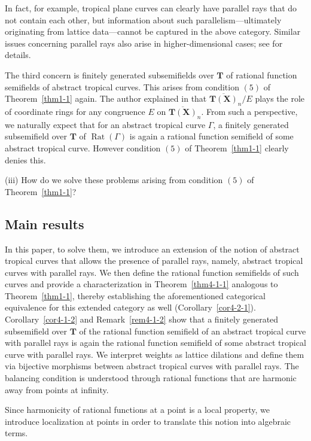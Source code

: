 \documentclass[a4paper,12pt]{amsart}
\def\Gamma{\varGamma}
\begin{document}
In fact, for example, tropical plane curves can clearly have parallel rays that do not contain each other, but information about such parallelism—ultimately originating from lattice data—cannot be captured in the above category.
Similar issues concerning parallel rays also arise in higher-dimensional cases; see \cite{Amini=Kawaguchi=Song} for details.

The third concern is finitely generated subsemifields over $\boldsymbol{T}$ of rational function semifields of abstract tropical curves.
This arises from condition $(5)$ of Theorem~\ref{thm1-1} again.
The author explained in \cite[Section~$1$]{JuAe4} that $\overline{\boldsymbol{T}(\boldsymbol{X})}_n / E$ plays the role of coordinate rings for any congruence $E$ on $\overline{\boldsymbol{T}(\boldsymbol{X})}_n$.
From such a perspective, we naturally expect that for an abstract tropical curve $\Gamma$, a finitely generated subsemifield over $\boldsymbol{T}$ of $\operatorname{Rat}(\Gamma)$ is again a rational function semifield of some abstract tropical curve.
However condition $(5)$ of Theorem~\ref{thm1-1} clearly denies this.

(iii) How do we solve these problems arising from condition $(5)$ of Theorem~\ref{thm1-1}?

\subsection*{Main results}

In this paper, to solve them, we introduce an extension of the notion of abstract tropical curves that allows the presence of parallel rays, namely, abstract tropical curves with parallel rays.
We then define the rational function semifields of such curves and provide a characterization in Theorem~\ref{thm4-1-1} analogous to Theorem~\ref{thm1-1}, thereby establishing the aforementioned categorical equivalence for this extended category as well (Corollary~\ref{cor4-2-1}).
Corollary~\ref{cor4-1-2} and Remark~\ref{rem4-1-2} show that a finitely generated subsemifield over $\boldsymbol{T}$ of the rational function semifield of an abstract tropical curve with parallel rays is again the rational function semifield of some abstract tropical curve with parallel rays.
We interpret weights as lattice dilations and define them via bijective morphisms between abstract tropical curves with parallel rays.
The balancing condition is understood through rational functions that are harmonic away from points at infinity.

Since harmonicity of rational functions at a point is a local property, we introduce localization at points in order to translate this notion into algebraic terms.
\end{document}
